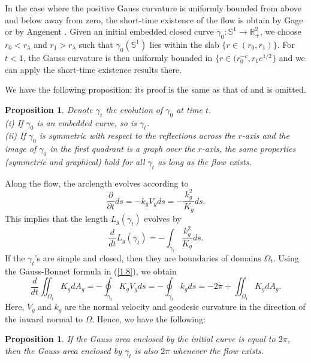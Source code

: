 \documentclass{amsart}
\theoremstyle{Corollary}
\newtheorem{prop}[theorem]{Proposition}
\numberwithin{equation}{section}
\begin{document}
In the case where the positive Gauss curvature is uniformly bounded from above and below away from zero,
the short-time existence of the flow
is obtain by Gage \cite{Gage} or by Angenent \cite{Angenent1}.
Given an initial embedded closed curve
$\gamma_0:\mathbb{S}^1\to \mathbb{R}^2_+$,
we choose $r_0<r_\lambda$ and $r_1>r_\lambda$
such that $\gamma_0(\mathbb{S}^1)$ lies within the slab
$\{r\in(r_0,r_1)\}$.
For $t<1$, the Gauss curvature is then uniformly bounded in $\{r\in (r_0^{-c},r_1e^{1/2}\}$
and we can apply the short-time existence results there.


We have the following proposition;
its proof is the same as that of  \cite[Proposition 5]{Drugan&Nguyen}
and is omitted.

\begin{prop}\label{prop5}
Denote $\gamma_t$ the evolution of $\gamma_0$ at time $t$.\\
(i) If $\gamma_0$ is an embedded curve, so is $\gamma_t$.\\
(ii) If $\gamma_0$ is symmetric with respect to the reflections across the $r$-axis and the image of $\gamma_0$
in the first quadrant is a graph over the $r$-axis, the same properties
(symmetric and graphical) hold for all $\gamma_t$ as long as the flow exists.
\end{prop}

Along the flow, the arclength evolves according to
$$\frac{\partial}{\partial t}ds
=-k_g V_gds=-\frac{k_g^2}{K_g}ds.$$
This implies that the length $L_g(\gamma_t)$ evolves by
\begin{equation}\label{1.9}
\frac{d}{dt}L_g(\gamma_t)
=-\int_{\gamma_t}\frac{k_g^2}{K_g}ds.
\end{equation}
If the $\gamma_t$'s
are simple and closed, then they are boundaries of domains $\Omega_t$.
Using the Gauss-Bonnet formula in (\ref{1.8}), we obtain
\begin{equation*}
\frac{d}{dt}\iint_{\Omega_t}K_g dA_g
=-\oint_{\gamma_t}K_g V_gds=-\oint_{\gamma_t}k_gds=-2\pi+\iint_{\Omega_t}K_g dA_g.
\end{equation*}
Here, $V_g$ and $k_g$ are the normal velocity and geodesic curvature in the direction of the inward normal to $\Omega$.
Hence, we have the following:

\begin{prop}\label{prop6}
If the Gauss area enclosed by the initial curve is equal to $2\pi$,
then the Gauss area enclosed by $\gamma_t$ is also $2\pi$ whenever the flow exists.
\end{prop}
\end{document}
